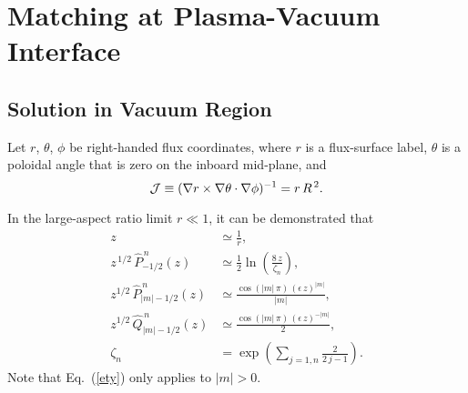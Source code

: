 \documentclass[12pt,prb,aps,notitlepage]{revtex4-1}
\begin{document}
\section{Matching at Plasma-Vacuum Interface}
\subsection{Solution in Vacuum Region}
Let $r$, $\theta$, $\phi$ be right-handed flux coordinates, where $r$ is a flux-surface label,  $\theta$ is a poloidal angle that is zero on the inboard mid-plane, and
\begin{equation}
{\cal J} \equiv (\nabla r\times\nabla\theta\cdot\nabla\phi)^{-1}= r\,R^{\,2}.
\end{equation}

In the large-aspect ratio limit $r\ll 1$, it can be demonstrated that 
\begin{align}\label{e25t}
z&\simeq \frac{1}{r},\\[0.5ex]
z^{\,1/2}\,\hat{P}^{\,n}_{-1/2}(z) &\simeq \frac{1}{2}\ln\left(\frac{8\,z}{\zeta_n}\right),\\[0.5ex]
z^{1/2}\,\hat{P}^{\,n}_{|m|-1/2}(z) &\simeq \frac{\cos(|m|\,\pi)\,(\epsilon\,z)^{|m|}}{|m|},\label{ety}\\[0.5ex]
z^{1/2}\,\hat{Q}^{\,n}_{|m|-1/2}(z) &\simeq \frac{\cos(|m|\,\pi)\,(\epsilon\,z)^{-|m|}}{2},\\[0.5ex]
\zeta_n &= \exp\left(\sum_{j=1,n}\frac{2}{2\,j-1}\right).\label{e29t}
\end{align}
Note that Eq.~(\ref{ety}) only applies to $|m|>0$. 
\end{document}
